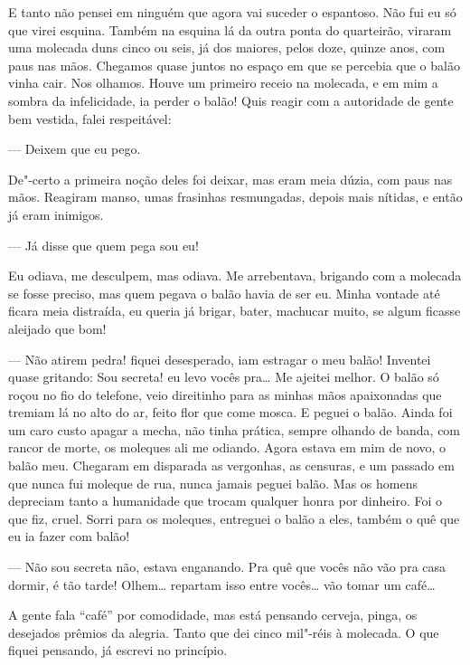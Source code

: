 E tanto não pensei em ninguém que agora vai suceder o espantoso. Não fui
eu só que virei esquina. Também na esquina lá da outra ponta do
quarteirão, viraram uma molecada duns cinco ou seis, já dos maiores,
pelos doze, quinze anos, com paus nas mãos. Chegamos quase juntos no
espaço em que se percebia que o balão vinha cair. Nos olhamos. Houve um
primeiro receio na molecada, e em mim a sombra da infelicidade, ia
perder o balão! Quis reagir com a autoridade de gente bem vestida, falei
respeitável:

--- Deixem que eu pego.

De"-certo a primeira noção deles foi deixar, mas eram meia dúzia, com
paus nas mãos. Reagiram manso, umas frasinhas resmungadas, depois mais
nítidas, e então já eram inimigos.

--- Já disse que quem pega sou eu!

Eu odiava, me desculpem, mas odiava. Me arrebentava, brigando com a
molecada se fosse preciso, mas quem pegava o balão havia de ser eu.
Minha vontade até ficara meia distraída, eu queria já brigar, bater,
machucar muito, se algum ficasse aleijado que bom!

--- Não atirem pedra! fiquei desesperado, iam estragar o meu balão!
Inventei quase gritando: Sou secreta! eu levo vocês pra\ldots{} Me ajeitei
melhor. O balão só roçou no fio do telefone, veio direitinho para as
minhas mãos apaixonadas que tremiam lá no alto do ar, feito flor que
come mosca. E peguei o balão. Ainda foi um caro custo apagar a mecha,
não tinha prática, sempre olhando de banda, com rancor de morte, os
moleques ali me odiando. Agora estava em mim de novo, o balão meu.
Chegaram em disparada as vergonhas, as censuras, e um passado em que
nunca fui moleque de rua, nunca jamais peguei balão. Mas os homens
depreciam tanto a humanidade que trocam qualquer honra por dinheiro. Foi
o que fiz, cruel. Sorri para os moleques, entreguei o balão a eles,
também o quê que eu ia fazer com balão!

--- Não sou secreta não, estava enganando. Pra quê que vocês não vão pra
casa dormir, é tão tarde! Olhem\ldots{} repartam isso entre vocês\ldots{} vão
tomar um café\ldots{}

A gente fala ``café'' por comodidade, mas está pensando cerveja, pinga, os
desejados prêmios da alegria. Tanto que dei cinco mil"-réis à molecada. O
que fiquei pensando, já escrevi no princípio.

